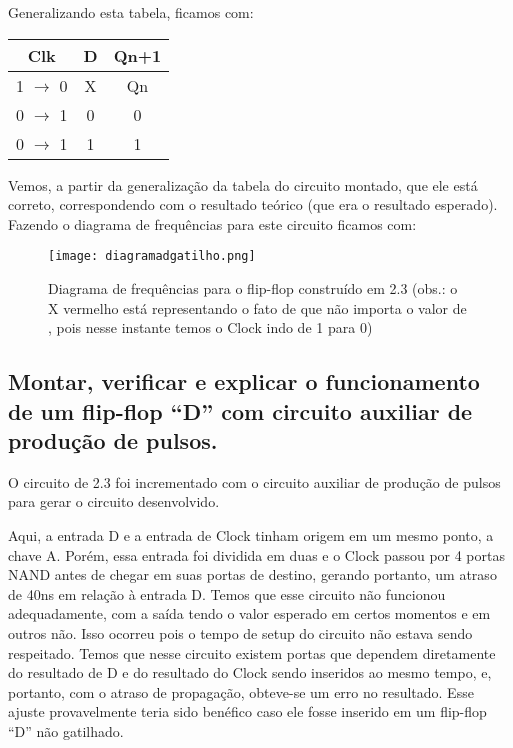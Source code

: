 \documentclass[12pt]{article}
\begin{document}
Generalizando esta tabela, ficamos com:

\begin{table}[H]
	\centering
	\begin{tabular}{|c|c|c|}
		\cline{1-3}
		\multicolumn{1}{|c|}{Clk} & \multicolumn{1}{|c|}{D} & \multicolumn{1}{|c|}{Qn+1} \\
		\hline
		1 $\rightarrow$ 0 & X & Qn \\
		\hline
		0 $\rightarrow$ 1 & 0 & 0 \\
		\hline
		0 $\rightarrow$ 1 & 1 & 1 \\
		\hline
	\end{tabular}
\end{table}

Vemos, a partir da generalização da tabela do circuito montado, que ele está correto, correspondendo com o resultado teórico (que era o resultado esperado). Fazendo o diagrama de frequências para este circuito ficamos com:

\begin{figure}[H]
	\centering
	\texttt{[image: diagramadgatilho.png]}
	\caption{Diagrama de frequências para o flip-flop construído em 2.3 (obs.: o X vermelho está representando o fato de que não importa o valor de , pois nesse instante temos o Clock indo de 1 para 0)}
	\label{fig:diagramadgatilho}
\end{figure}


\subsection{Montar, verificar e explicar o funcionamento de um flip-flop “D” com circuito auxiliar de produção de pulsos.}

O circuito de 2.3 foi incrementado com o circuito auxiliar de produção de pulsos para gerar o circuito desenvolvido. 

Aqui, a entrada D e a entrada de Clock tinham origem em um mesmo ponto, a chave A. Porém, essa entrada foi dividida em duas e o Clock passou por 4 portas NAND antes de chegar em suas portas de destino, gerando portanto, um atraso de 40ns em relação à entrada D. Temos que esse circuito não funcionou adequadamente, com a saída tendo o valor esperado em certos momentos e em outros não.  Isso ocorreu pois o tempo de setup do circuito não estava sendo respeitado. Temos que nesse circuito existem portas que dependem diretamente do resultado de D e do resultado do Clock sendo inseridos ao mesmo tempo, e, portanto, com o atraso de propagação, obteve-se um erro no resultado. Esse ajuste provavelmente teria sido benéfico caso ele fosse inserido em um flip-flop “D” não gatilhado.
\end{document}
